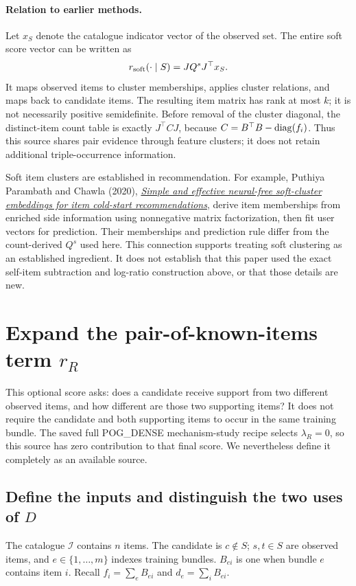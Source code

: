 \documentclass[11pt,a4paper]{article}
\newcommand{\I}{\mathcal I}\newcommand{\pos}[1]{\left[#1\right]_+}
\numberwithin{equation}{section}
\begin{document}
\paragraph{Relation to earlier methods.}
Let $x_S$ denote the catalogue indicator vector of the observed set. The entire
soft score vector can be written as
\[
 r_{\rm soft}(\cdot\mid S)=JQ^sJ^\top x_S.
\]
It maps observed items to cluster memberships, applies cluster relations, and
maps back to candidate items. The resulting item matrix has rank at most $k$;
it is not necessarily positive semidefinite. Before removal of the cluster
diagonal, the distinct-item count table is exactly $J^\top C J$, because
$C=B^\top B-\operatorname{diag}(f_i)$. Thus this source shares pair evidence through
feature clusters; it does not retain additional triple-occurrence information.

Soft item clusters are established in recommendation. For example, Puthiya
Parambath and Chawla (2020),
\href{https://doi.org/10.1007/s10618-020-00708-6}{\emph{Simple and effective
neural-free soft-cluster embeddings for item cold-start recommendations}},
derive item memberships from enriched side information using nonnegative matrix
factorization, then fit user vectors for prediction. Their memberships and
prediction rule differ from the count-derived $Q^s$ used here. This connection
supports treating soft clustering as an established ingredient. It does not
establish that this paper used the exact self-item subtraction and log-ratio
construction above, or that those details are new.

\section{Expand the pair-of-known-items term $r_R$}\label{agreementdef}
This optional score asks: does a candidate receive support from two different
observed items, and how different are those two supporting items? It does not
require the candidate and both supporting items to occur in the same training
bundle. The saved full POG\_DENSE mechanism-study recipe selects
$\lambda_R=0$, so this source has zero contribution to that final score.
We nevertheless define it completely as an available source.

\subsection{Define the inputs and distinguish the two uses of $D$}
The catalogue $\I$ contains $n$ items. The candidate is $c\notin S$; $s,t\in S$
are observed items, and $e\in\{1,\ldots,m\}$ indexes training bundles.
$B_{ei}$ is one when bundle $e$ contains item $i$.
Recall $f_i=\sum_eB_{ei}$ and $d_e=\sum_iB_{ei}$.
\end{document}
